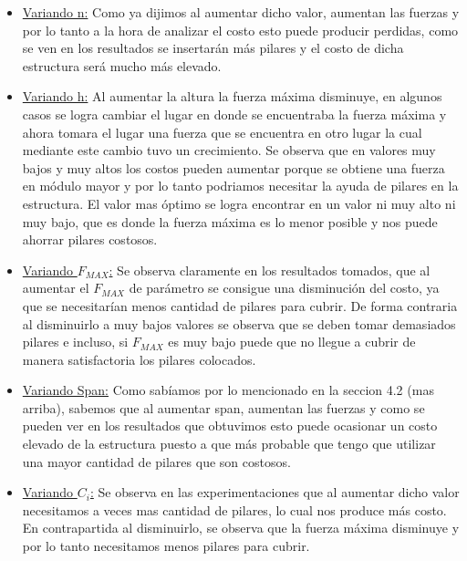 \begin{itemize}
\item \underline{Variando n:} Como ya dijimos al aumentar dicho valor, aumentan las fuerzas y por lo tanto a la hora de analizar el costo esto puede producir perdidas, como se ven en los resultados se insertar\'an m\'as pilares y el costo de dicha estructura ser\'a mucho m\'as elevado.

\item \underline{Variando h:} Al aumentar la altura la fuerza m\'axima disminuye, en algunos casos se logra cambiar el lugar en donde se encuentraba la fuerza m\'axima y ahora tomara el lugar una fuerza que se encuentra en otro lugar la cual mediante este cambio tuvo un crecimiento.\newline
Se observa que en valores muy bajos y muy altos los costos pueden aumentar porque se obtiene una fuerza en m\'odulo mayor y por lo tanto podriamos necesitar la ayuda de pilares en la estructura. El valor mas \'optimo se logra encontrar en un valor ni muy alto ni muy bajo, que es donde la fuerza m\'axima es lo menor posible y nos puede ahorrar pilares costosos.

\item \underline{Variando $F_{MAX}$:} Se observa claramente en los resultados tomados, que al aumentar el $F_{MAX}$ de par\'ametro se consigue una disminuci\'on del costo, ya que se necesitar\'ian menos cantidad de pilares para cubrir. De forma contraria al disminuirlo a muy bajos valores se observa que se deben tomar demasiados pilares e incluso, si $F_{MAX}$ es muy bajo puede que no llegue a cubrir de manera satisfactoria los pilares colocados.

\item \underline{Variando Span:} Como sab\'iamos por lo mencionado en la seccion 4.2 (mas arriba), sabemos que al aumentar span, aumentan las fuerzas y como se pueden ver en los resultados que obtuvimos esto puede ocasionar un costo elevado de la estructura puesto a que m\'as probable que tengo que utilizar una mayor cantidad de pilares que son costosos.

\item \underline{Variando $C_i$:} Se observa en las experimentaciones que al aumentar dicho valor necesitamos a veces mas cantidad de pilares, lo cual nos produce m\'as costo.
En contrapartida al disminuirlo, se observa que la fuerza m\'axima disminuye y por lo tanto necesitamos menos pilares para cubrir.

\end{itemize}

